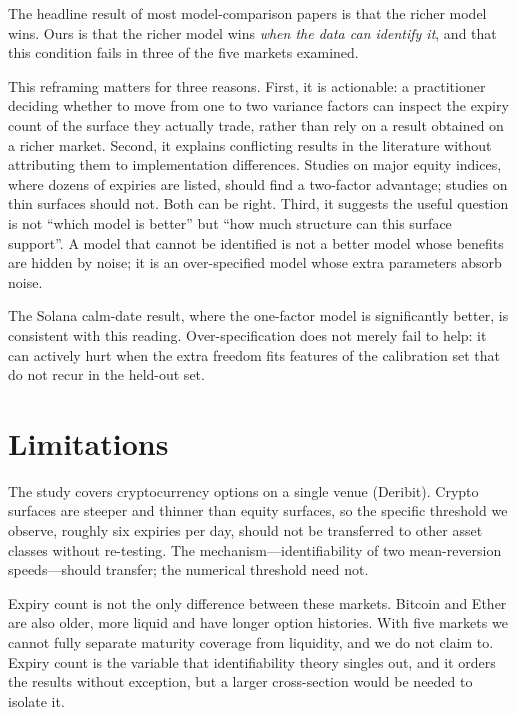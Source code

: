 \documentclass[runningheads]{llncs}
\begin{document}
The headline result of most model-comparison papers is that the richer model
wins. Ours is that the richer model wins \emph{when the data can identify it},
and that this condition fails in three of the five markets examined.

This reframing matters for three reasons. First, it is actionable: a
practitioner deciding whether to move from one to two variance factors can
inspect the expiry count of the surface they actually trade, rather than rely
on a result obtained on a richer market. Second, it explains conflicting
results in the literature without attributing them to implementation
differences. Studies on major equity indices, where dozens of expiries are
listed, should find a two-factor advantage; studies on thin surfaces should
not. Both can be right. Third, it suggests the useful question is not ``which
model is better'' but ``how much structure can this surface support''. A model
that cannot be identified is not a better model whose benefits are hidden by
noise; it is an over-specified model whose extra parameters absorb noise.

The Solana calm-date result, where the one-factor model is significantly
better, is consistent with this reading. Over-specification does not merely
fail to help: it can actively hurt when the extra freedom fits features of the
calibration set that do not recur in the held-out set.

\section{Limitations}

The study covers cryptocurrency options on a single venue (Deribit). Crypto surfaces are
steeper and thinner than equity surfaces, so the specific threshold we observe,
roughly six expiries per day, should not be transferred to other asset classes
without re-testing. The mechanism---identifiability of two mean-reversion
speeds---should transfer; the numerical threshold need not.

Expiry count is not the only difference between these markets. Bitcoin and
Ether are also older, more liquid and have longer option histories. With five
markets we cannot fully separate maturity coverage from liquidity, and we do
not claim to. Expiry count is the variable that identifiability theory
singles out, and it orders the results without exception, but a larger
cross-section would be needed to isolate it.
\end{document}

